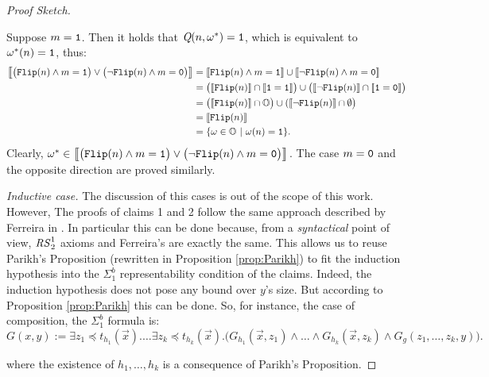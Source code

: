 \begin{proof}[Proof Sketch]
\begin{itemize}
\begin{enumerate}
Suppose $m=\mathtt{1}$.
Then it holds that $\emph{Q}(n,\omega^*)=\mathtt{1}$,
which is equivalent to $\omega^*(n)=\mathtt{1}$, thus:
\small
\begin{align*}
\big\llbracket\big(\Flip({n}) \wedge
{m}=\one\big) \vee \big(\neg\Flip({n})
\wedge {m}=\zero\big)\big\rrbracket
&=
\llbracket \Flip({n}) \wedge {m}=\one\rrbracket \cup
\llbracket \neg\Flip({n}) \wedge
{m} = \zero\rrbracket \\
%
&= \big(\llbracket \Flip({n})\rrbracket \cap
\llbracket \one =\one\rrbracket \big)
\cup \big(\llbracket \neg\Flip({n})\rrbracket
\cap \llbracket \one =\zero\rrbracket\big) \\
%
&=  \big(\llbracket \Flip({n})\rrbracket
\cap \Os \big) \cup (\llbracket \neg \Flip({n})
\rrbracket \cap \emptyset \big) \\
%
&= \llbracket \Flip({n})\rrbracket \\
%
&= \{\omega \in\Os \ | \ \omega(n)=\oone\}.
\end{align*}
\normalsize
Clearly, $\omega^*\in \big\llbracket\big(\mathtt{Flip}({n})
\wedge {m}=\mathtt{1}\big)
\vee \big(\neg\mathtt{Flip}({n}) \wedge
{m}=\mathtt{0}\big)\big\rrbracket$.
The case $m=\mathtt{0}$ and the opposite direction
are proved similarly.
\end{enumerate}

\end{itemize}

\emph{Inductive case.}
The discussion of this cases is out of the scope of this
work. However, The proofs of claims 1 and 2 follow the same approach
described by Ferreira in \cite{Ferreira88, Ferreira90}.
In particular this can be done because, from a \emph{syntactical}
point of view, ${\mathit{RS}^1_2}$ axioms and Ferreira's are exactly the same. This allows us to reuse Parikh's Proposition \cite{Parikh71} (rewritten in Proposition \ref{prop:Parikh}) to fit the induction hypothesis into the $\Sigma^b_1$ representability condition of the claims. Indeed, the induction hypothesis does not pose any bound over $y$'s size. But according to Proposition \ref{prop:Parikh} this can be done. So, for instance, the case of composition, the $\Sigma^b_1$ formula is:
$$
G(x,y) := \exists z_1\preceq t_{h_1}(\vec{x}).
\dots \exists z_k\preceq t_{h_k}(\vec{x}).
\big(G_{h_1}(\vec{x},z_1) \wedge \dots
\wedge G_{h_k}(\vec{x},z_k) \wedge
G_g(z_1,\dots, z_k,y)\big).
$$

where the existence of $h_1,\ldots,h_k$ is a consequence of Parikh's Proposition.

\end{proof}
